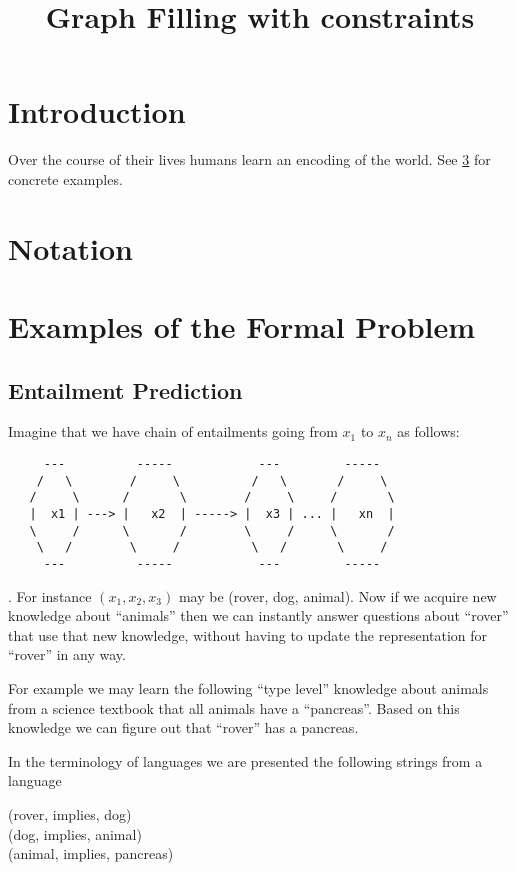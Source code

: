 \documentclass[11pt]{article}
\title{Graph Filling with constraints}
\begin{document}
\maketitle
\section{Introduction}
\label{sec:introduction} Over the course of their lives humans learn
an encoding of the world.   See
\ref{sec:exampl-form-probl} for concrete examples.

\section{Notation}


\section{Examples of the Formal Problem}
\label{sec:exampl-form-probl}


\subsection{Entailment Prediction}
\label{subsec:entailment}
Imagine that we have chain of entailments going from $x_1$ to $x_n$ as follows:

\begin{verbatim}
     ---          -----            ---         -----
    /   \        /     \          /   \       /     \
   /     \      /       \        /     \     /       \
   |  x1 | ---> |   x2  | -----> |  x3 | ... |   xn  |
   \     /      \       /        \     /     \       /
    \   /        \     /          \   /       \     /
     ---          -----            ---         -----
\end{verbatim}
               .
For instance $(x_1, x_2, x_3)$ may be (rover, dog, animal). Now if we
acquire new knowledge about ``animals'' then we can instantly answer
questions about ``rover'' that use that new knowledge, without having
to update the representation for ``rover'' in any way.

For example we may learn the following ``type level'' knowledge about
animals from a science textbook that all animals have a
``pancreas''. Based on this knowledge we can figure out that ``rover''
has a pancreas.

In the terminology of languages we are presented the following strings
from a language

(rover, implies, dog) \\
(dog, implies, animal) \\
(animal, implies, pancreas)
\end{document}
